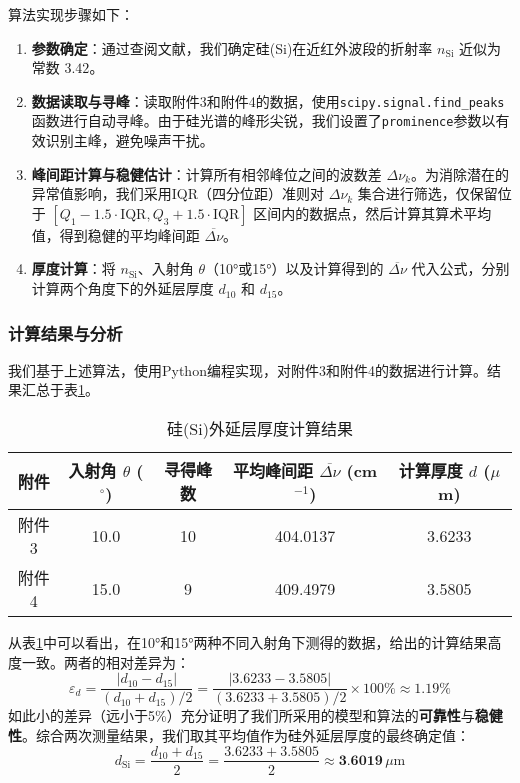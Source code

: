 \documentclass{ctexart} %
\begin{document}
算法实现步骤如下：
\begin{enumerate}
    \item \textbf{参数确定}：通过查阅文献\cite{Green2008Silicon}，我们确定硅(Si)在近红外波段的折射率 $n_{\text{Si}}$ 近似为常数 $3.42$。
    \item \textbf{数据读取与寻峰}：读取附件3和附件4的数据，使用\texttt{scipy.signal.find\_peaks}函数进行自动寻峰。由于硅光谱的峰形尖锐，我们设置了\texttt{prominence}参数以有效识别主峰，避免噪声干扰。
    \item \textbf{峰间距计算与稳健估计}：计算所有相邻峰位之间的波数差 $\Delta\nu_k$。为消除潜在的异常值影响，我们采用IQR（四分位距）准则对 $\Delta\nu_k$ 集合进行筛选，仅保留位于 $[Q_1 - 1.5 \cdot \text{IQR}, Q_3 + 1.5 \cdot \text{IQR}]$ 区间内的数据点，然后计算其算术平均值，得到稳健的平均峰间距 $\overline{\Delta\nu}$。
    \item \textbf{厚度计算}：将 $n_{\text{Si}}$、入射角 $\theta$（10°或15°）以及计算得到的 $\overline{\Delta\nu}$ 代入公式，分别计算两个角度下的外延层厚度 $d_{10}$ 和 $d_{15}$。
\end{enumerate}

\subsubsection{计算结果与分析}

我们基于上述算法，使用Python编程实现，对附件3和附件4的数据进行计算。结果汇总于表\ref{tab:si_thickness_results}。

\begin{table}[htbp]
    \centering
    \caption{硅(Si)外延层厚度计算结果}
    \label{tab:si_thickness_results}
    \begin{tabular}{ccccc}
        \toprule
        附件  & 入射角 $\theta$ ($^\circ$) & 寻得峰数 & 平均峰间距 $\overline{\Delta\nu}$ (cm$^{-1}$) & 计算厚度 $d$ ($\mu$m) \\
        \midrule
        附件3 & 10.0                    & 10   & 404.0137                                 & 3.6233            \\
        附件4 & 15.0                    & 9    & 409.4979                                 & 3.5805            \\
        \bottomrule
    \end{tabular}
\end{table}

从表\ref{tab:si_thickness_results}中可以看出，在10°和15°两种不同入射角下测得的数据，给出的计算结果高度一致。两者的相对差异为：
$$
    \varepsilon_d = \frac{|d_{10} - d_{15}|}{(d_{10} + d_{15})/2} = \frac{|3.6233 - 3.5805|}{(3.6233 + 3.5805)/2} \times 100\% \approx 1.19\%
$$
如此小的差异（远小于5\%）充分证明了我们所采用的模型和算法的\textbf{可靠性}与\textbf{稳健性}。综合两次测量结果，我们取其平均值作为硅外延层厚度的最终确定值：
$$
    d_{\text{Si}} = \frac{d_{10} + d_{15}}{2} = \frac{3.6233 + 3.5805}{2} \approx \textbf{3.6019} \, \mu\text{m}
$$
\end{document}
